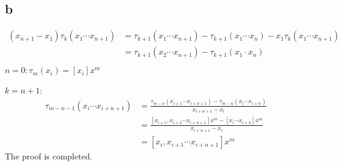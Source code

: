\documentclass[a4paper]{article}
\begin{document}
\subsection*{b}
\begin{align*}
  (x_{n+1}-x_1)\tau_k(x_1 \cdots x_{n+1}) &= \tau_{k+1}(x_1\cdots x_{n+1})-\tau_{k+1}(x_1\cdots x_{n})-x_1\tau_k(x_1\cdots x_{n+1}) \\
  &=\tau_{k+1}(x_2\cdots x_{n+1})-\tau_{k+1}(x_1 \cdot x_n) \\
\end{align*}
$n = 0 : \tau_m(x_i)=[x_i]x^m$

$k = n+1:$\\
\begin{align*}
  \tau_{m-n-1}(x_i\cdots x_{i+n+1}) &= \frac{\tau_{m-n}(x_{i+1}\cdots x_{i+n+1})-\tau_{m-n}(x_i\cdots x_{i+n})}{x_{i+n+1}-x_i} \\
  &= \frac{[x_{i+1},x_{i+2}\cdots x_{i+n+1}]x^{m}-[x_i\cdots x_{i+n}]x^m}{x_{i+n+1}-x_i} \\
  &= [x_i,x_{i+1}\cdots x_{i+n+1}]x^{m}
\end{align*}
The proof is completed.\cite*{openai2024chatgpt}
\section*{  }
\printbibliography
\end{document}
